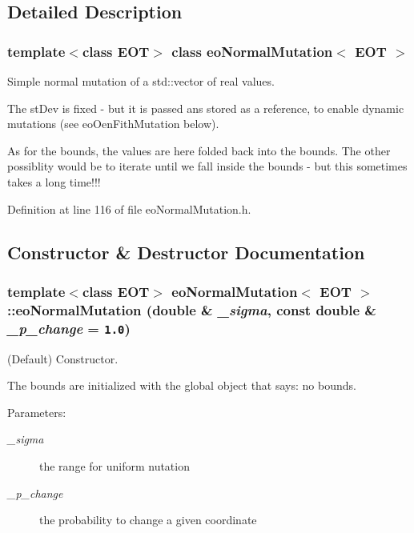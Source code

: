 \subsection{Detailed Description}
\subsubsection*{template$<$class EOT$>$ class eo\-Normal\-Mutation$<$ EOT $>$}

Simple normal mutation of a std::vector of real values. 

The st\-Dev is fixed - but it is passed ans stored as a reference, to enable dynamic mutations (see eo\-Oen\-Fith\-Mutation below).

As for the bounds, the values are here folded back into the bounds. The other possiblity would be to iterate until we fall inside the bounds - but this sometimes takes a long time!!! 



Definition at line 116 of file eo\-Normal\-Mutation.h.

\subsection{Constructor \& Destructor Documentation}
\subsubsection{\setlength{\rightskip}{0pt plus 5cm}template$<$class EOT$>$ {\bf eo\-Normal\-Mutation}$<$ {\bf EOT} $>$::{\bf eo\-Normal\-Mutation} (double \& {\em \_\-sigma}, const double \& {\em \_\-p\_\-change} = {\tt 1.0})\hspace{0.3cm}{\tt  [inline]}}\label{classeo_normal_mutation_a0}


(Default) Constructor. 

The bounds are initialized with the global object that says: no bounds.

\begin{Desc}
\item[Parameters:]
\begin{description}
\item[{\em \_\-sigma}]the range for uniform nutation \item[{\em \_\-p\_\-change}]the probability to change a given coordinate \end{description}
\end{Desc}


